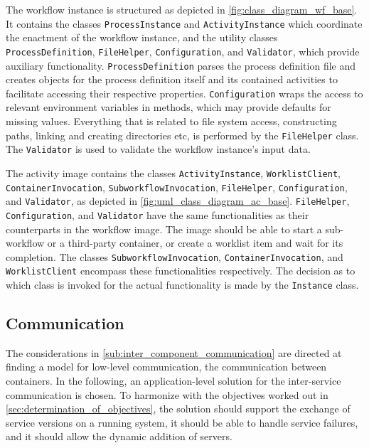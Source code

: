   The workflow instance is structured as depicted in \ref{fig:class_diagram_wf_base}. It contains the classes \texttt{ProcessInstance} and \texttt{ActivityInstance} which coordinate the enactment of the workflow instance, and the utility classes \texttt{ProcessDefinition}, \texttt{FileHelper}, \texttt{Configuration}, and \texttt{Validator}, which provide auxiliary functionality.
  \texttt{ProcessDefinition} parses the process definition file and creates objects for the process definition itself and its contained activities to facilitate accessing their respective properties.
  \texttt{Configuration} wraps the access to relevant environment variables in methods, which may provide defaults for missing values. Everything that is related to file system access, \eg constructing paths, linking and creating directories etc, is performed by the \texttt{FileHelper} class. The \texttt{Validator} is used to validate the workflow instance's input data.

  The activity image contains the classes \texttt{ActivityInstance}, \texttt{WorklistClient}, \texttt{ContainerInvocation}, \texttt{SubworkflowInvocation}, \texttt{FileHelper}, \texttt{Configuration}, and \texttt{Validator}, as depicted in \ref{fig:uml_class_diagram_ac_base}.
  \texttt{FileHelper}, \texttt{Configuration}, and \texttt{Validator} have the same functionalities as their counterparts in the workflow image. The image should be able to start a sub-workflow or a third-party container, or create a worklist item and wait for its completion. The classes \texttt{SubworkflowInvocation}, \texttt{ContainerInvocation}, and \texttt{WorklistClient} encompass these functionalities respectively. The decision as to which class is invoked for the actual functionality is made by the \texttt{Instance} class.


\subsection{Communication} %
  \label{sub:application_level_communication}
  The considerations in \ref{sub:inter_component_communication} are directed at finding a model for low-level communication, \ie the communication between containers. In the following, an application-level solution for the inter-service communication is chosen. To harmonize with the objectives worked out in \ref{sec:determination_of_objectives}, the solution should  support the exchange of service versions on a running system, it should be able to handle service failures, and it should allow the dynamic addition of servers.

